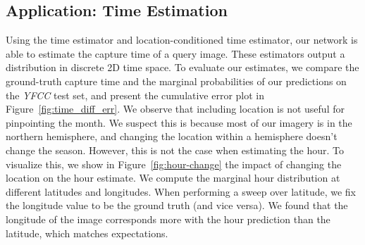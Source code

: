 \documentclass{bmvc2k}
\newcommand{\figref}[1]{Figure~\ref{fig:#1}}
\begin{document}
\subsection{Application: Time Estimation}

Using the time estimator and location-conditioned time estimator, our
network is able to estimate the capture time of a query image. These
estimators output a distribution in discrete 2D time space. To
evaluate our estimates, we compare the ground-truth capture time and
the marginal probabilities of our predictions on the {\em YFCC}
test set, and present the cumulative error plot in
\figref{time_diff_err}. We observe that including location is not
useful for  pinpointing the month. We suspect this is because most of
our imagery is in the northern hemisphere, and changing the location
within a hemisphere doesn't change the season. However, this is not
the case when estimating the hour.  To visualize this, we show in
\figref{hour-change} the impact of changing the location on the hour
estimate.  We compute the marginal hour distribution at different
latitudes and longitudes. When performing a sweep over latitude, we
fix the longitude value to be the ground truth (and vice versa). We
found that the longitude of the image corresponds more with the hour
prediction than the latitude, which matches expectations.
\end{document}
